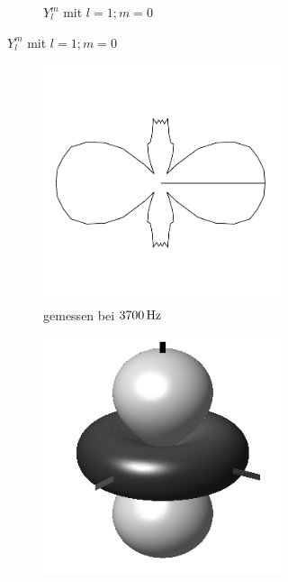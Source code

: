 \documentclass[numbers=noenddot,12pt,a4paper]{scrartcl}
\begin{document}
\begin{figure}[H]
\begin{subfigure}[h]{0.3\textwidth}
\begin{subfigure}[b]{\textwidth}
		\caption{$Y_l^m$ mit $l=1;m=0$} \label{img:l1y}
	\end{subfigure}
	\end{subfigure}
	\begin{subfigure}[h]{0.3\textwidth}
	\begin{subfigure}[b]{\textwidth}
		\includegraphics[angle=90,origin=c,width=\textwidth]{messwerte/polarl2.pdf}
		\caption{gemessen bei $\unit[3700]{Hz}$} \label{img:l2}
		\end{subfigure}
		\begin{subfigure}[b]{\textwidth}
			\includegraphics[width=\textwidth]{Spherical_Harmonics_deg3l2m0.png}

\end{subfigure}
\end{subfigure}
\end{figure}
\end{document}
